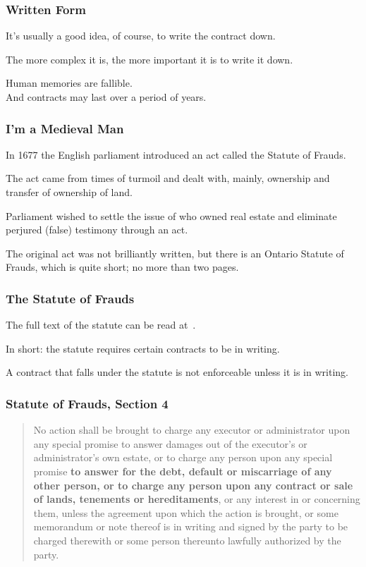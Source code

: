 \begin{frame}
\frametitle{Written Form}

It's usually a good idea, of course, to write the contract down.

The more complex it is, the more important it is to write it down.

Human memories are fallible.\\
\quad And contracts may last over a period of years.


\end{frame}



\begin{frame}
\frametitle{I'm a Medieval Man}

In 1677 the English parliament introduced an act called the \alert{Statute of Frauds}.

The act came from times of turmoil and dealt with, mainly, ownership and transfer of ownership of land.

Parliament wished to settle the issue of who owned real estate and eliminate \alert{perjured} (false) testimony through an act.

The original act was not brilliantly written, but there is an Ontario Statute of Frauds, which is quite short; no more than two pages.

\end{frame}



\begin{frame}
\frametitle{The Statute of Frauds}

The full text of the statute can be read at~\cite{sof}.

In short: the statute requires certain contracts to be in writing.

A contract that falls under the statute is not enforceable unless it is in writing.

\end{frame}



\begin{frame}
\frametitle{Statute of Frauds, Section 4}


\begin{quote}
No action shall be brought to charge any executor or administrator upon any special promise to answer damages out of the executor's or administrator's own estate, or to charge any person upon any special promise \textbf{to answer for the debt, default or miscarriage of any other person, or to charge any person upon any contract or sale of lands, tenements or hereditaments}, or any interest in or concerning them, unless the agreement upon which the action is brought, or some memorandum or note thereof is in writing and signed by the party to be charged therewith or some person thereunto lawfully authorized by the party.~\cite{sof}
\end{quote}

\end{frame}



